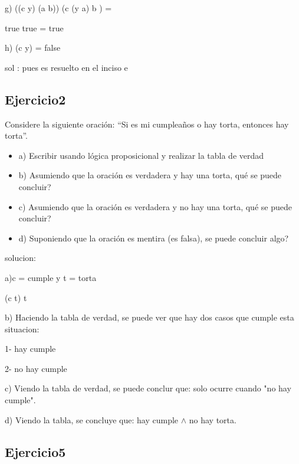 \documentclass[10pt,a4paper]{article}
\begin{document}
g) ((c \vee y) \wedge (a \vee b)) \iff (c \vee (y \wedge a) \vee b ) =

 true \iff true = true

\vspace{0.3cm}

h) (\neg c \wedge \neg y) = false 

sol : pues es resuelto en el inciso e

\subsection{Ejercicio2}

Considere la siguiente oración: “Si es mi cumpleaños o hay torta, entonces hay torta”.
\begin{itemize}
	\item a) Escribir usando lógica proposicional y realizar la tabla de verdad
	\item b) Asumiendo que la oración es verdadera y hay una torta, qué se puede concluir?
	\item c) Asumiendo que la oración es verdadera y no hay una torta, qué se puede concluir?
        \item d) Suponiendo que la oración es mentira (es falsa), se puede concluir algo?
\end{itemize}

\vspace{0.3cm}

solucion:

\vspace{0.3cm}

a)c = cumple y t = torta 

(c \lor t) \implies t 

\vspace{0.3cm}

b) Haciendo la tabla de verdad, se puede ver que hay dos casos que cumple esta situacion:

1- hay cumple 

2- no hay cumple

\vspace{0.3cm}

c) Viendo la tabla de verdad, se puede conclur que: solo ocurre cuando "no hay cumple".

\vspace{0.3cm}

d) Viendo la tabla, se concluye que: hay cumple  $\wedge$    no hay torta.

\subsection{Ejercicio5}
\end{document}
